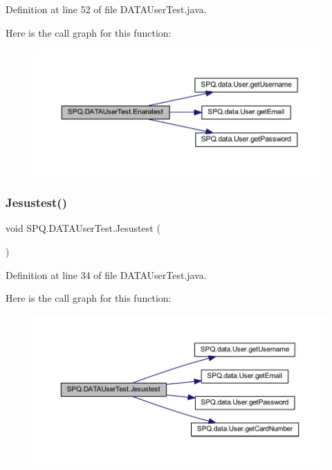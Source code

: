 Definition at line 52 of file D\+A\+T\+A\+User\+Test.\+java.

Here is the call graph for this function\+:\nopagebreak
\begin{figure}[H]
\begin{center}
\leavevmode
\includegraphics[width=350pt]{class_s_p_q_1_1_d_a_t_a_user_test_a84d1c3d3992383e1cb93d07241cf3f02_cgraph}
\end{center}
\end{figure}
\mbox{\label{class_s_p_q_1_1_d_a_t_a_user_test_a29a15c9122a588e854a02c6c2fe1d203}} 
\subsubsection{\texorpdfstring{Jesustest()}{Jesustest()}}
{\footnotesize\ttfamily void S\+P\+Q.\+D\+A\+T\+A\+User\+Test.\+Jesustest (\begin{DoxyParamCaption}{ }\end{DoxyParamCaption})}



Definition at line 34 of file D\+A\+T\+A\+User\+Test.\+java.

Here is the call graph for this function\+:\nopagebreak
\begin{figure}[H]
\begin{center}
\leavevmode
\includegraphics[width=350pt]{class_s_p_q_1_1_d_a_t_a_user_test_a29a15c9122a588e854a02c6c2fe1d203_cgraph}
\end{center}
\end{figure}
\mbox{\label{class_s_p_q_1_1_d_a_t_a_user_test_a703753b88018d83f5a2d3b76d335889a}} 
